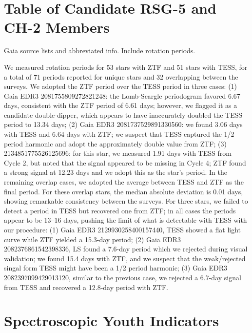 \documentclass[12pt,twocolumn,linenumbers]{aastex63}
\begin{document}
% 
% 
% 
% 

\clearpage
                            
 

\appendix
\section{Table of Candidate RSG-5 and CH-2 Members}
\label{app:members}

Gaia source lists and abbreviated info.  Include rotation periods.

We measured rotation periods for 53 stars with ZTF and 51 stars with
TESS, for a total of 71 periods reported for unique stars and 32
overlapping between the surveys. We adopted the ZTF period over the
TESS period in three cases: (1) Gaia EDR3 2081755809272821248: the
Lomb-Scargle periodogram favored 6.67 days, consistent with the ZTF
period of 6.61 days; however, we flagged it as a candidate
double-dipper, which appears to have inaccurately doubled the TESS
period to 13.34 days; (2) Gaia EDR3 2081737529891330560: we found 3.06
days with TESS and 6.64 days with ZTF; we suspect that TESS captured
the 1/2-period harmonic and adopt the approximately double value from
ZTF; (3) 2134851775526125696: for this star, we measured 1.91 days
with TESS from Cycle 2, but noted that the signal appeared to be
missing in Cycle 4; ZTF found a strong signal at 12.23 days and we
adopt this as the star's period. In the remaining overlap cases, we
adopted the average between TESS and ZTF as the final period. For
these overlap stars, the median absolute deviation is 0.01 days,
showing remarkable consistency between the surveys. For three stars,
we failed to detect a period in TESS but recovered one from ZTF; in
all cases the periods appear to be 13--16 days, pushing the limit of
what is detectable with TESS with our procedure: (1) Gaia EDR3
2129930258400157440, TESS showed a flat light curve while ZTF yielded
a 15.3-day period; (2) Gaia EDR3 2082376861542398336, LS found a
7.6-day period which we rejected during visual validation; we found
15.4 days with ZTF, and we suspect that the weak/rejected singal form
TESS might have been a 1/2 period harmonic; (3) Gaia EDR3
2082397099429013120, similar to the previous case, we rejected a
6.7-day signal from TESS and recovered a 12.8-day period with ZTF. 


\section{Spectroscopic Youth Indicators}
\label{app:spectra}
\end{document}
